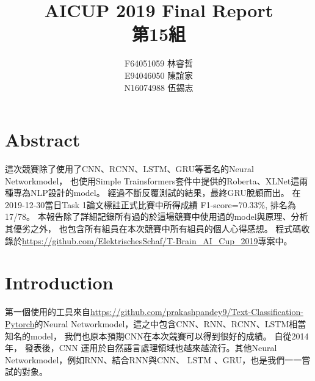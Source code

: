 \documentclass[8pt,a4paper]{article}
\begin{document}

\title{\bf{ AICUP 2019 Final Report }\\第15組}
\date{}
\author{F64051059 林睿哲 \\ E94046050 陳誼家 \\ N16074988 伍錫志  }

\maketitle

\section*{Abstract} 
\label{sec:Abstract}

這次競賽除了使用了CNN、RCNN、LSTM、GRU等著名的Neural Networkmodel，
也使用Simple Trainsformers套件中提供的Roberta、XLNet這兩種專為NLP設計的model。
經過不斷反覆測試的結果，最終GRU脫穎而出。
在2019-12-30當日Task 1論文標註正式比賽中所得成績 F1-score=70.33\%, 排名為17/78。
本報告除了詳細記錄所有過的於這場競賽中使用過的model與原理、分析其優劣之外，
也包含所有組員在本次競賽中所有組員的個人心得感想。
程式碼收錄於\url{https://github.com/ElektrischesSchaf/T-Brain_AI_Cup_2019}專案中。

\section*{Introduction} 
\label{sec:Introduction}

第一個使用的工具來自\url{https://github.com/prakashpandey9/Text-Classification-Pytorch}的Neural Networkmodel，這之中包含CNN、RNN、RCNN、LSTM相當知名的model，
我們也原本預期CNN在本次競賽可以得到很好的成績。
自從2014年，\cite{kim2014} 發表後，CNN 運用於自然語言處理領域也越來越流行。其他Neural Networkmodel，例如RNN\cite{lai2015}、結合RNN與CNN\cite{wang2016}、
LSTM \cite{huang2015}、GRU\cite{luo2017}，也是我們一一嘗試的對象。\\
\end{document}
